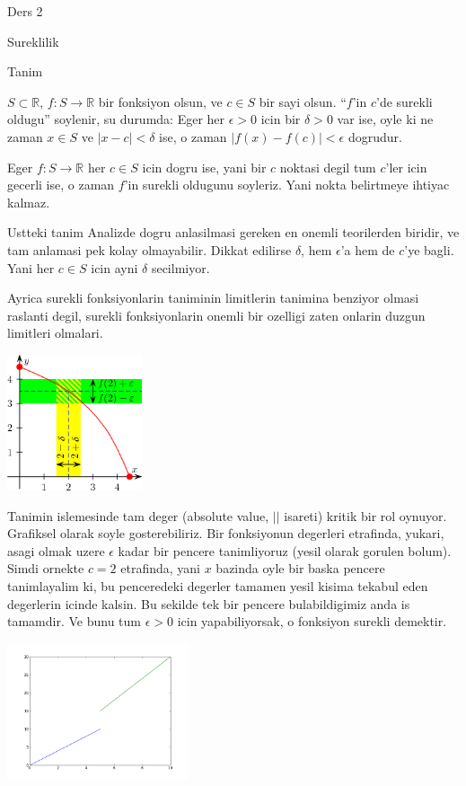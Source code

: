 \documentclass[12pt,fleqn]{article}
\begin{document}
Ders 2

Sureklilik

Tanim

$S \subset \mathbb{R}$, $f: S \to \mathbb{R}$ bir fonksiyon olsun, ve $c
\in S$ bir sayi olsun. 
``$f$'in $c$'de surekli oldugu'' soylenir, su durumda: Eger her
$\epsilon>0$ icin bir $\delta > 0$ var ise, oyle ki ne zaman $x \in S$ ve $|x-c| < \delta$
ise, o zaman $|f(x) - f(c)| < \epsilon$ dogrudur. 

Eger  $f: S \to \mathbb{R}$ her $c \in S$ icin dogru ise, yani bir $c$
noktasi degil tum $c$'ler icin gecerli ise, o zaman $f$'in surekli oldugunu
soyleriz. Yani nokta belirtmeye ihtiyac kalmaz. 

Ustteki tanim Analizde dogru anlasilmasi gereken en onemli teorilerden
biridir, ve tam anlamasi pek kolay olmayabilir. Dikkat edilirse $\delta$,
hem $\epsilon$'a hem de $c$'ye bagli. Yani her $c \in S$ icin ayni $\delta$ secilmiyor.

Ayrica surekli fonksiyonlarin taniminin limitlerin tanimina benziyor olmasi 
raslanti degil, surekli fonksiyonlarin onemli bir ozelligi zaten onlarin
duzgun limitleri olmalari.

\includegraphics[height=4cm]{2_5.png}

Tanimin islemesinde tam deger (absolute value, $||$ isareti) kritik bir rol
oynuyor. Grafiksel olarak soyle gosterebiliriz. Bir fonksiyonun degerleri
etrafinda, yukari, asagi olmak uzere $\epsilon$ kadar bir pencere
tanimliyoruz (yesil olarak gorulen bolum). Simdi ornekte $c=2$ etrafinda,
yani $x$ bazinda oyle bir baska pencere tanimlayalim ki, bu penceredeki
degerler tamamen yesil kisima tekabul eden degerlerin icinde kalsin. Bu
sekilde tek bir pencere bulabildigimiz anda is tamamdir. Ve bunu tum
$\epsilon > 0$ icin yapabiliyorsak, o fonksiyon surekli demektir. 

\includegraphics[height=4cm]{2_4.png}
\end{document}
